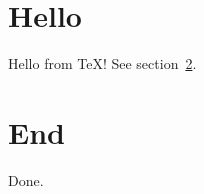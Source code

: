 \documentclass{article}
\begin{document}
\section{Hello}
Hello from \TeX! See section~\ref{sec:end}.
\section{End}\label{sec:end}
Done.
\end{document}
